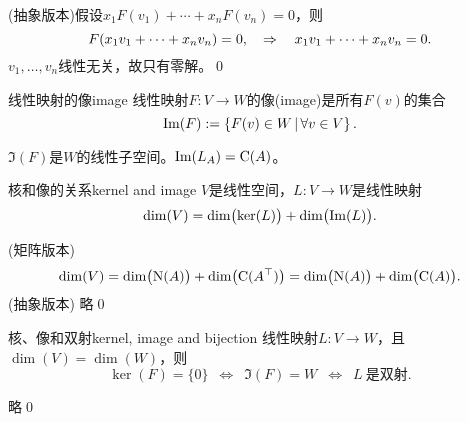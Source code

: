 (抽象版本)假设$x_1F(v_1)+\cdots+x_nF(v_n)=0$，则
\[
	F(x_1v_1+\cdots+x_nv_n)=0,\quad\Rightarrow\quad x_1v_1+\cdots+x_nv_n=0.
\]
$v_1,\ldots,v_n$线性无关，故只有零解。\qed
\begin{definition}{线性映射的像}{image}
	线性映射$F:V\to W$的像(image)是所有$F(v)$的集合
	\[
		\operatorname{Im}(F):=\left\{F(v)\in W\,\middle\vert\,\forall v\in V\right\}.
	\]
\end{definition}
$\Im(F)$是$W$的线性子空间。$\operatorname{Im}(L_A)=\operatorname{C}(A)$。
\begin{theorem}{核和像的关系}{kernel and image}
	$V$是线性空间，$L:V\to W$是线性映射 
	\begin{equation}
		\dim(V)=\dim\bigl(\ker(L)\bigr)+\dim\bigl(\operatorname{Im}(L)\bigr).
	\end{equation}
\end{theorem}
\prf (矩阵版本)
\[
	\dim(V)=\dim\bigl(\operatorname{N}(A)\bigr)+\dim\bigl(\operatorname{C}(A^\top)\bigr)=\dim\bigl(\operatorname{N}(A)\bigr)+\dim\bigl(\operatorname{C}(A)\bigr).
\]
(抽象版本) 略\qed
\begin{theorem}{核、像和双射}{kernel, image and bijection}
	线性映射$L:V\to W$，且$\dim(V)=\dim(W)$，则 
	\[
		\ker(F)=\{0\}\enspace\Leftrightarrow\enspace\Im(F)=W\enspace\Leftrightarrow\enspace L~\text{是双射.}
	\]
\end{theorem}
\prf 略\qed
